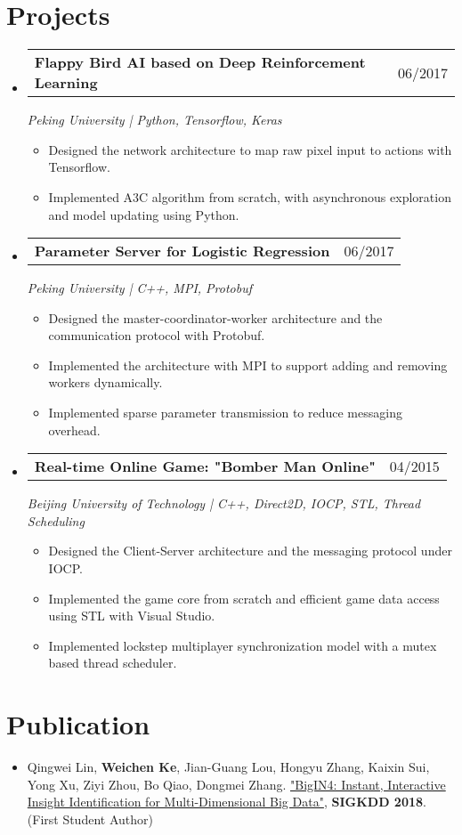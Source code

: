 \documentclass[a4paper,11pt]{article}
\makeatletter
\newcommand{\resumeItem}[1]{
  \item\small{#1 \vspace{-2pt}}
}
\newcommand{\resumeSubheading}[3]{
  \vspace{-1pt}\item
    \begin{tabular*}{0.97\textwidth}{l@{\extracolsep{\fill}}r}
      \textbf{#1} & #2
      \end{tabular*}
      \textit{\small#3}
}
\newcommand{\resumeItemListStart}{\begin{itemize}[leftmargin=*, topsep=0ex]}
\newcommand{\resumeItemListEnd}{\end{itemize}}
\makeatother
\begin{document}
\section{Projects}
  \begin{itemize}[leftmargin=*, itemsep=5pt, label={}]
    \resumeSubheading{Flappy Bird AI based on Deep Reinforcement Learning}{06/2017}
    {Peking University | Python, Tensorflow, Keras}
        \resumeItemListStart
            \resumeItem {Designed the network architecture to map raw pixel input to actions with Tensorflow.}
            \resumeItem {Implemented A3C algorithm from scratch, with asynchronous exploration and model updating using Python.}
        \resumeItemListEnd
    
    \resumeSubheading{Parameter Server for Logistic Regression}{06/2017}
    {Peking University | C++, MPI, Protobuf}
        \resumeItemListStart
            \resumeItem {Designed the master-coordinator-worker architecture and the communication protocol with Protobuf.}
            \resumeItem {Implemented the architecture with MPI to support adding and removing workers dynamically.}
            \resumeItem {Implemented sparse parameter transmission to reduce messaging overhead.}
        \resumeItemListEnd
        
    \resumeSubheading{Real-time Online Game: "Bomber Man Online"}{04/2015}{Beijing University of Technology | C++, Direct2D, IOCP, STL, Thread Scheduling}
        \resumeItemListStart
            \resumeItem {Designed the Client-Server architecture and the messaging protocol under IOCP.}
            \resumeItem {Implemented the game core from scratch and efficient game data access using STL with Visual Studio.}
            \resumeItem {Implemented lockstep multiplayer synchronization model with a mutex based thread scheduler.}
        \resumeItemListEnd
        
  \end{itemize}

\section{Publication}
  \begin{itemize}[leftmargin=*, itemsep=0pt]
    \resumeItem 
    {Qingwei Lin, \textbf{Weichen Ke}, Jian-Guang Lou, Hongyu Zhang, Kaixin Sui, Yong Xu, Ziyi Zhou, Bo Qiao, Dongmei Zhang. \href{http://www.kdd.org/kdd2018/accepted-papers/view/bigin4-instant-interactive-insight-identification-for-multi-dimensional-big}{"BigIN4: Instant, Interactive Insight Identification for Multi-Dimensional Big Data"}, \textbf{SIGKDD 2018}.  (First Student Author) }
  \end{itemize}
\end{document}
